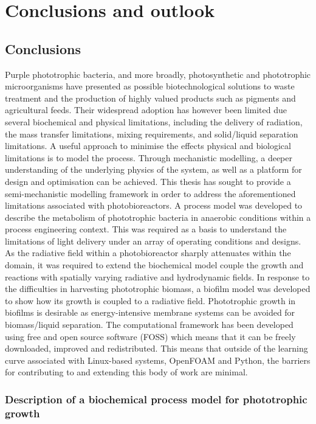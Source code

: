 \chapter[Conclusions and outlook]{Conclusions and outlook}
\label{chap:conclusion}

\section{Conclusions}
Purple phototrophic bacteria, and more broadly, photosynthetic and phototrophic microorganisms have presented as possible biotechnological solutions to waste treatment and the production of highly valued products such as pigments and agricultural feeds. Their widespread adoption has however been limited due several biochemical and physical limitations, including the delivery of radiation, the mass transfer limitations, mixing requirements, and solid/liquid separation limitations. 
\skippingparagraph
A useful approach to minimise the effects physical and biological limitations is to model the process. Through mechanistic modelling, a deeper understanding of the underlying physics of the system, as well as a platform for design and optimisation can be achieved. This thesis has sought to provide a semi-mechanistic modelling framework in order to address the aforementioned limitations associated with photobioreactors. A process model was developed to describe the metabolism of phototrophic bacteria in anaerobic conditions within a process engineering context. This was required as a basis to understand the limitations of light delivery under an array of operating conditions and designs. As the radiative field within a photobioreactor sharply attenuates within the domain, it was required to extend the biochemical model couple the growth and reactions with spatially varying radiative and hydrodynamic fields. In response to the difficulties in harvesting phototrophic biomass, a biofilm model was developed to show how its growth is coupled to a radiative field. Phototrophic growth in biofilms is desirable as energy-intensive membrane systems can be avoided for biomass/liquid separation. The computational framework has been developed using free and open source software (FOSS) which means that it can be freely downloaded, improved and redistributed. This means that outside of the learning curve associated with Linux-based systems, OpenFOAM and Python, the barriers for contributing to and extending this body of work are minimal.

\subsection{Description of a biochemical process model for phototrophic growth}

